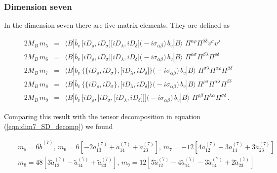 \subsubsection{Dimension seven}\label{subsecc:dim_7_SD_NRQCD}
\vspace{-0.3cm}
In the dimension seven there are five matrix elements. They are defined as \cite{Mannel:2010wj}

\begin{eqnarray}
2M_B\, m_5 &=& \langle B | \bar b_v \, \big[ i D_\rho  , i D_\sigma\big] 
\big[ i D_\lambda ,  i D_\delta\big]  \big (-i \sigma_{\alpha \beta}\big)\,b_v
| B \rangle \,\,  \Pi^{\alpha \rho} \Pi^{\beta \delta} v^\sigma v^\lambda \nonumber\\
\nonumber
2M_B\, m_6 &=& \langle B | \bar b_v \, \big[ i D_\rho  , i D_\sigma \big] 
\big[i D_\lambda , i D_\delta\big]  \big (-i \sigma_{\alpha \beta}\big)\,b_v 
| B \rangle \,\, \Pi^{\alpha \sigma} \Pi^{\beta \lambda} \Pi^{\rho \delta}  \nonumber\\
2M_B\, m_7 &=& \langle B | \bar b_v \,\Big \lbrace \big \lbrace i D_\rho,  
i D_\sigma \big \rbrace ,\big[ i D_\lambda , i D_\delta \big] \Big\rbrace 
\big (-i \sigma_{\alpha \beta}\big)\,b_v | B \rangle \,\, \Pi^{\sigma \lambda}
\Pi^{\alpha \rho} \Pi^{\beta \delta} \nonumber\\
2M_B\, m_8 &=&  \langle B | \bar b_v \,\Big \lbrace \big \lbrace
i D_\rho ,  i D_\sigma \big \rbrace, \big[i D_\lambda  , i D_\delta \big] 
\Big\rbrace \big (-i \sigma_{\alpha \beta}\big)\,b_v | B \rangle \: 
\Pi^{\rho \sigma } \Pi^{\alpha \lambda} \Pi^{\beta \delta} \nonumber \\
2M_B\, m_9 &=& \langle B | \bar b_v \, \bigg[ i D_\rho ,  \Big[ i D_\sigma ,
\big[ i D_\lambda ,  i D_\delta \big]\Big]\bigg]  \big (-i \sigma_{\alpha \beta}\big) 
\,b_v | B \rangle \,\, \Pi^{\rho \beta} \Pi^{\lambda \alpha} \Pi^{\sigma \delta}\,.
\end{eqnarray}

Comparing this result with the tensor decomposition in equation (\ref{eqn:dim7_SD_decomp}) we found 

\begin{eqnarray}
&&m_5=6\tilde{b}^{(7)},\,m_6=6\left[-2 \tilde{a}^{(7)}_{13} + \tilde{a}^{(7)}_{14} +\tilde{a}^{(7)}_{23}\right],\,m_7=-12\left[4 \tilde{a}^{(7)}_{12} -3 \tilde{a}^{(7)}_{14} +3\tilde{a}^{(7)}_{23}\right]\nonumber\\
&&m_8=48\left[3 \tilde{a}^{(7)}_{12} - \tilde{a}^{(7)}_{14} +\tilde{a}^{(7)}_{23}\right],\,m_9=12\left[5 \tilde{a}^{(7)}_{12}-4 \tilde{a}^{(7)}_{14} -3 \tilde{a}^{(7)}_{14} +2\tilde{a}^{(7)}_{23}\right]
\end{eqnarray}
